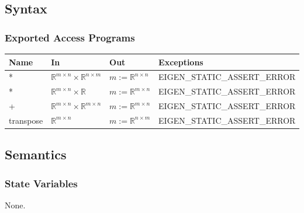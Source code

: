 \documentclass[12pt, titlepage]{article}
\begin{document}
\subsection{Syntax}


\subsubsection{Exported Access Programs}

\begin{center}
\begin{tabular}{p{2cm} p{3cm} p{2.5cm} p{4.5cm}}
\hline
\textbf{Name} & \textbf{In} & \textbf{Out} & \textbf{Exceptions} \\
\hline
* & $\mathbb{R}^{m \times n} \times \mathbb{R}^{n \times m}$ & $m:=\mathbb{R}^{n \times n}$ &
EIGEN\_STATIC\_ASSERT\_ERROR \\
* & $\mathbb{R}^{m \times n} \times \mathbb{R}$ & $m:=\mathbb{R}^{m \times n}$ &
EIGEN\_STATIC\_ASSERT\_ERROR \\
+ & $\mathbb{R}^{m \times n} \times \mathbb{R}^{m \times n}$ & $m:=\mathbb{R}^{m \times n}$ &
EIGEN\_STATIC\_ASSERT\_ERROR \\
transpose & $\mathbb{R}^{m \times n}$ & $m:=\mathbb{R}^{n \times m}$ & EIGEN\_STATIC\_ASSERT\_ERROR \\
\hline
\end{tabular}
\end{center}

\subsection{Semantics}

\subsubsection{State Variables}

None.


\end{document}
